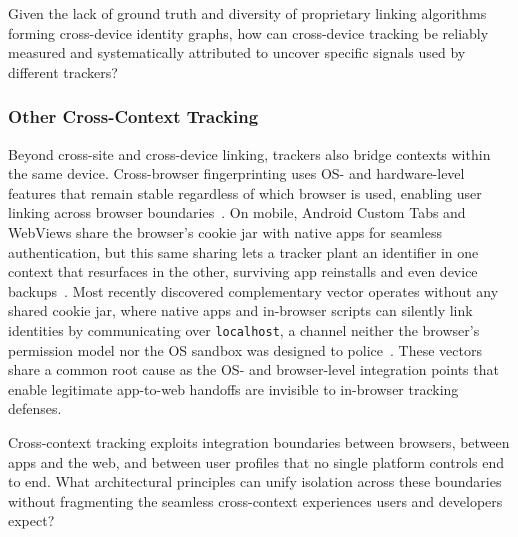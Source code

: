 \begin{opbox}
Given the lack of ground truth and diversity of proprietary linking algorithms forming cross-device identity graphs, how can cross-device tracking be reliably measured and systematically attributed to uncover specific signals used by different trackers?
\end{opbox}



\subsubsection{Other Cross-Context Tracking}
\label{sec:mixed-techniques-cross-context}

Beyond cross-site and cross-device linking, trackers also bridge contexts within the same device.
%
Cross-browser fingerprinting uses OS- and hardware-level features that remain stable regardless of which browser is used, enabling user linking across browser boundaries~\cite{caoCrossBrowserFingerprintingOS2017}.
%
On mobile, Android Custom Tabs and WebViews share the browser's cookie jar with native apps for seamless authentication, but this same sharing lets a tracker plant an identifier in one context that resurfaces in the other, surviving app reinstalls and even device backups~\cite{wessels2025hytrack}.
%
Most recently discovered complementary vector operates without any shared cookie jar, where native apps and in-browser scripts can silently link identities by communicating over \texttt{localhost}, a channel neither the browser's permission model nor the OS sandbox was designed to police~\cite{localmess-usenix-sec-26}.
%
These vectors share a common root cause as the OS- and browser-level integration points that enable legitimate app-to-web handoffs are invisible to in-browser tracking defenses.

\begin{opbox}
Cross-context tracking exploits integration boundaries between browsers, between apps and the web, and between user profiles that no single platform controls end to end. What architectural principles can unify isolation across these boundaries without fragmenting the seamless cross-context experiences users and developers expect?
\end{opbox}
